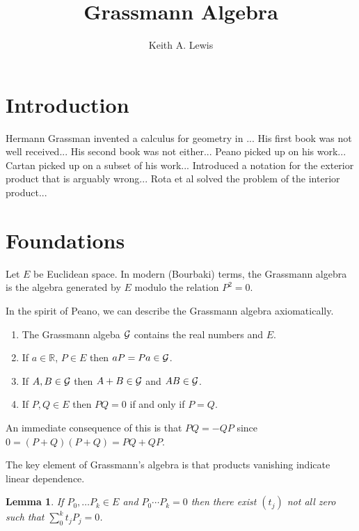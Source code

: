 \documentclass[11pt,fleqn]{article}
\title{Grassmann Algebra}
\author{Keith A. Lewis}
\newcommand{\G}{{\cal G}}
\newcommand{\R}{\mathbb{R}}
\newtheorem{lemma}{Lemma}[section]
\begin{document}
\maketitle

\section{Introduction}

Hermann Grassman invented a calculus for geometry in ...
His first book was not well received...
His second book was not either...
Peano picked up on his work...
Cartan picked up on a subset of his work...
Introduced a notation for the exterior product that is arguably wrong...
Rota et al solved the problem of the interior product...

\section{Foundations}

Let \(E\) be Euclidean space. In modern (Bourbaki) terms, the
Grassmann algebra is the algebra generated by \(E\) modulo the relation
\(P^2 = 0\).

In the spirit of Peano\cite{Pea1891}, we can describe the Grassmann algebra axiomatically.

\begin{enumerate}[i]

\item The Grassmann algeba \(\G\) contains the real numbers and \(E\).

\item If \(a\in\R\), \(P\in E\) then \(aP = Pa \in \G\).

\item If \(A,B \in \G\) then \(A + B \in \G\) and \(AB \in \G\).

\item If \(P,Q\in E\) then \(PQ = 0\) if and only if \(P = Q\).

\end{enumerate}

An immediate consequence of this is that \(PQ = -QP\)
since \(0 = (P + Q)(P + Q) = PQ + QP\).

The key element of Grassmann's algebra is that products vanishing
indicate linear dependence.

\begin{lemma}
If \(P_0, \dots P_k\in E\) and \(P_0\cdots P_k = 0\) then there
exist \((t_j)\) not all zero such that \(\sum_0^k t_j P_j = 0\).
\end{lemma}
\end{document}

